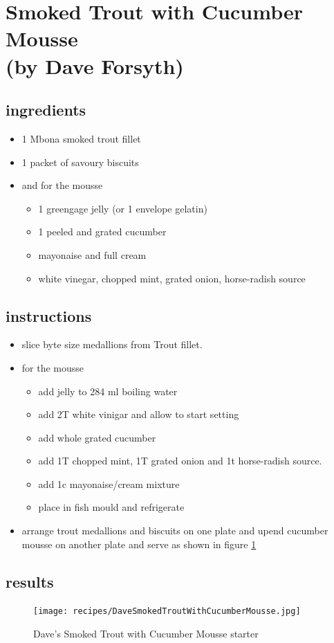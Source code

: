 \section{Smoked Trout with Cucumber Mousse \\ (by Dave Forsyth)}

\subsection*{ingredients}

\begin{itemize}
\item 1 Mbona smoked trout fillet
\item 1 packet of savoury biscuits
\item and for the mousse
\begin{itemize}
\item 1 greengage jelly (or 1 envelope gelatin)
\item 1 peeled and grated cucumber 
\item mayonaise and full cream
\item white vinegar, chopped mint, grated onion, horse-radish source
\end{itemize}
\end{itemize}

\subsection*{instructions}

\begin{itemize}
\item slice byte size medallions from Trout fillet.
\item for the mousse
\begin{itemize}
\item add jelly to 284 ml boiling water
\item add 2T white vinigar and allow to start setting
\item add whole grated cucumber 
\item add 1T chopped mint, 1T grated onion and 1t horse-radish source.
\item add 1c mayonaise/cream mixture
\item place in fish mould and refrigerate
\end{itemize}
\item arrange trout medallions and biscuits on one plate and upend cucumber mousse on another plate and serve as shown in figure \ref{fig:daveStarter}
\end{itemize}

\subsection*{results}
  
\begin{figure}[H]
\centering
  \texttt{[image: recipes/DaveSmokedTroutWithCucumberMousse.jpg]} 
     \caption{Dave's Smoked Trout with Cucumber Mousse starter}
  \label{fig:daveStarter}
\end{figure}  

